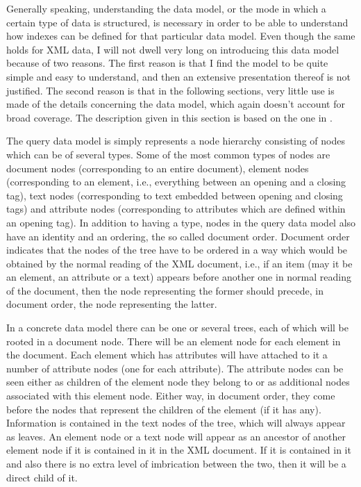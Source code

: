 \documentclass[a4paper,10pt]{article}
\begin{document}
Generally speaking, understanding the data model, or the mode in which a certain type
of data is structured, is necessary in order to be able to understand how indexes can be
defined for that particular data model. Even though the same holds for XML data, I will
not dwell very long on introducing this data model because of two reasons. The first
reason is that I find the model to be quite simple and easy to understand, and then
an extensive presentation thereof is not justified. The second reason is that in the following
sections, very little use is made of the details concerning the data model, which again
doesn't account for broad coverage. The description given in this section is based on the
one in \cite{cha04}.

The query data model is simply represents a node hierarchy consisting of nodes which
can be of several types. Some of the most common types of nodes are document nodes
(corresponding to an entire document), element nodes (corresponding to an element, i.e.,
everything between an opening and a closing tag), text nodes (corresponding to text embedded
between opening and closing tags) and attribute nodes (corresponding to attributes which
are defined within an opening tag). In addition to having a type, nodes in the query data
model also have an identity and an ordering, the so called document order. Document
order indicates that the nodes of the tree have to be ordered in a way which would be
obtained by the normal reading of the XML document, i.e., if an item (may it be an element,
an attribute or a text) appears before another one in normal reading of the document,
then the node representing the former should precede, in document order, the node
representing the latter.

In a concrete data model there can be one or several trees, each of which will be rooted in
a document node. There will be an element node for each element in the document. Each
element which has attributes will have attached to it a number of attribute nodes (one
for each attribute). The attribute nodes can be seen either as children of the element 
node they belong to or as additional nodes associated with this element node. Either way,
in document order, they come before the nodes that represent the children of the element
(if it has any). Information is contained in the text nodes of the tree, which will always
appear as leaves. An element node or a text node will appear as an ancestor of another
element node if it is contained in it in the XML document. If it is contained in it and also
there is no extra level of imbrication between the two, then it will be a direct child
of it.
\end{document}
